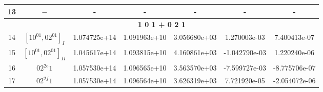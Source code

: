 \begin{table}[h!]
\begin{tabular}{|c|c|c|c|c|c|c|}
13 & $-$ & - & - & - & - & - \\ \hline
\multicolumn{7}{|c|}{\textbf{1 0 1 + 0 2 1}} \\ \hline
14 & $[10^01, 02^01]_{I}$ & 1.074725e+14 & 1.091963e+10 & 3.056680e+03 & 1.270003e-03 & 7.400413e-07 \\ \hline
15 & $[10^01, 02^01]_{II}$ & 1.045617e+14 & 1.093815e+10 & 4.160861e+03 & -1.042790e-03 & 1.220240e-06 \\ \hline
16 & $02^{2e}1$ & 1.057530e+14 & 1.096565e+10 & 3.563570e+03 & -7.599727e-03 & -8.775706e-07 \\ \hline
17 & $02^{2f}1$ & 1.057530e+14 & 1.096564e+10 & 3.626319e+03 & 7.721920e-05 & -2.054072e-06 \\ \hline
\end{tabular}
\end{table}



